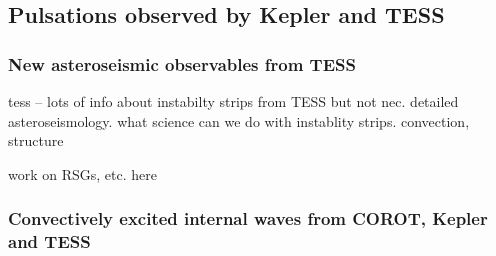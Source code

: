 {\color{blue}
\subsection{Pulsations observed by Kepler and TESS}



\subsubsection{New asteroseismic observables from TESS}

tess -- lots of info about instabilty strips from TESS but not nec. detailed asteroseismology.  what science can we do with instablity strips.  convection, structure

work on RSGs, etc. here

\subsubsection{Convectively excited internal waves from COROT, Kepler and TESS}


}